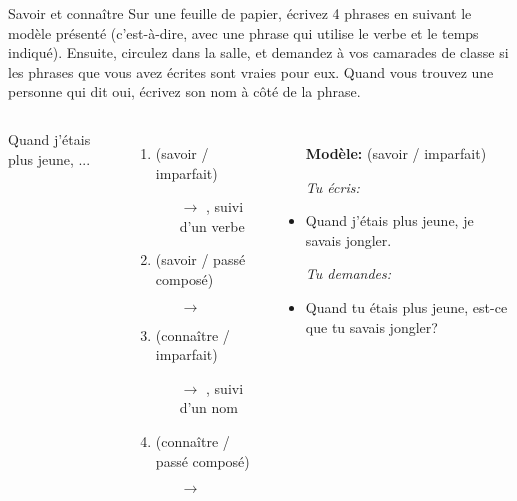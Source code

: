 \begin{frame}{Savoir et connaître}
  \small
  Sur une feuille de papier, écrivez 4 phrases en suivant le modèle présenté (c'est-à-dire, avec une phrase qui utilise le verbe et le temps indiqué).
  Ensuite, circulez dans la salle, et demandez à vos camarades de classe si les phrases que vous avez écrites sont vraies pour eux.
  Quand vous trouvez une personne qui dit oui, écrivez son nom à côté de la phrase.
  \vspace{0.25cm}
  \begin{columns}
    \small
      Quand j'étais plus jeune, ...
      \begin{enumerate}
        \item {}(savoir / imparfait)
        \begin{itemize}
          \scriptsize
          \item[$\to$] , suivi d'un verbe
        \end{itemize}
        \item {}(savoir / passé composé)
        \begin{itemize}
          \scriptsize
          \item[$\to$] 
        \end{itemize}
        \item {}(connaître / imparfait)
        \begin{itemize}
          \scriptsize
          \item[$\to$] , suivi d'un nom
        \end{itemize}
        \item {}(connaître / passé composé)
        \begin{itemize}
          \scriptsize
          \item[$\to$] 
        \end{itemize}
      \end{enumerate}
      \begin{itemize}
        \item[] \textbf{Modèle:} (savoir / imparfait)
        \item[] \emph{Tu écris:}
        \item Quand j'étais plus jeune, je savais jongler.
        \item[] \emph{Tu demandes:}
        \item Quand tu étais plus jeune, est-ce que tu savais jongler?
      \end{itemize}
  \end{columns}
\end{frame}